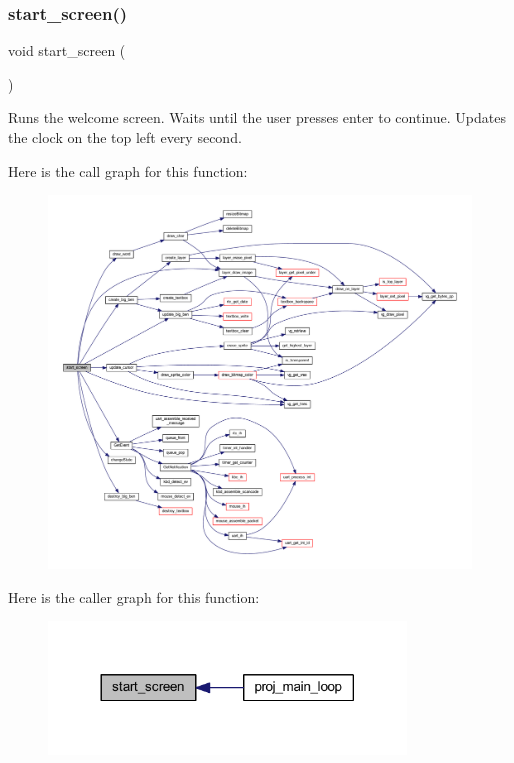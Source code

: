 \subsubsection{\texorpdfstring{start\+\_\+screen()}{start\_screen()}}
{\footnotesize\ttfamily void start\+\_\+screen (\begin{DoxyParamCaption}{ }\end{DoxyParamCaption})}



Runs the welcome screen. Waits until the user presses enter to continue. Updates the clock on the top left every second. 

Here is the call graph for this function\+:
\nopagebreak
\begin{figure}[H]
\begin{center}
\leavevmode
\includegraphics[width=350pt]{group__pengoo_gadeb18b17fc386f53c77fbcd19dc7a8e6_cgraph}
\end{center}
\end{figure}
Here is the caller graph for this function\+:\nopagebreak
\begin{figure}[H]
\begin{center}
\leavevmode
\includegraphics[width=269pt]{group__pengoo_gadeb18b17fc386f53c77fbcd19dc7a8e6_icgraph}
\end{center}
\end{figure}
\mbox{\label{group__pengoo_gae0cdf0dedf98ccbeac43b0300e0d2df1}} 
